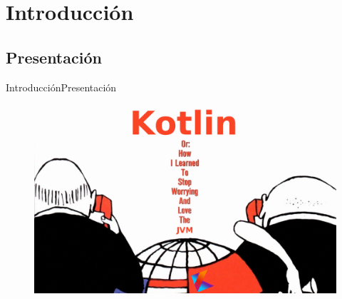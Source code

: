 \section{Introducción}


\subsection{Presentación}
\begin{frame}{Introducción}{Presentación}
 \begin{figure}[h]
  \centering
  \includegraphics[width=\textwidth]{images/introduction/cover}
 \end{figure}
\end{frame}

